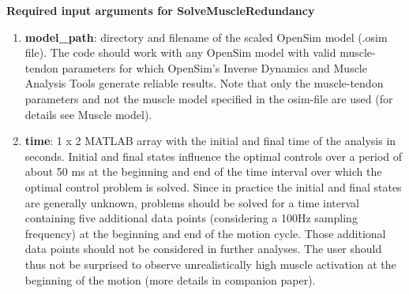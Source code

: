 \documentclass[a4paper,oneside,11pt]{article}
\begin{document}
\textbf{Required input arguments for SolveMuscleRedundancy}
\begin{enumerate}
	\item \textbf{model_path}: directory and filename of the scaled OpenSim model (.osim file). The code should work with any OpenSim model with valid muscle-tendon parameters for which OpenSim's Inverse Dynamics and Muscle Analysis Tools generate reliable results. Note that only the muscle-tendon parameters and not the muscle model specified in the osim-file are used (for details see Muscle model).
	\item \textbf{time}: 1 x 2 MATLAB array with the initial and final time of the analysis in seconds. Initial and final states influence the optimal controls over a period of about 50 ms at the beginning and end of the time interval over which the optimal control problem is solved. Since in practice the initial and final states are generally unknown, problems should be solved for a time interval containing five additional data points (considering a 100Hz sampling frequency) at the beginning and end of the motion cycle. Those additional data points should not be considered in further analyses. The user should thus not be surprised to observe unrealistically high muscle activation at the beginning of the motion (more details in companion paper).
	

\end{enumerate}
\end{document}
